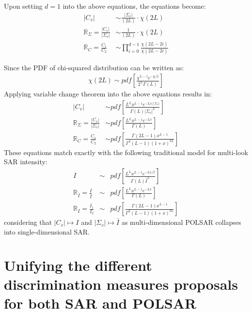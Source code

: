 \documentclass[journal]{IEEEtran}
\begin{document}
Upon setting $d=1$ into the above equations,
  the equations become:
\begin{align*}
  |C_v| &\sim  \frac{|\Sigma_v|}{(2L)} \cdot \chi (2L) \\ %
  \mathbb{R}_{\Sigma} = \frac{|C_v|}{|\Sigma_v|} &\sim \frac{1}{(2L)} \cdot \chi(2L) \\ %
\mathbb{R}_{C} = \frac{C_1}{C_2} &\sim \prod_{i=0}^{d-1} \frac{\chi(2L-2i)}{\chi(2L-2i)}
\end{align*}

Since the PDF of chi-squared distribution can be written as:
\begin{align*}
\chi(2L) \sim pdf \left[ \frac{\chi^{L-1}e^{-\chi/2}}{2^L\Gamma(L)} \right]
\end{align*}
Applying variable change theorem into the above equations results in:
\begin{align*}
  |C_v| &\sim  pdf \left[ \frac{L^L x^{L-1} e^{-Lx/|\Sigma_v|}}{\Gamma(L) |\Sigma_v|^L} \right] \\ %
  \mathbb{R}_{\Sigma} = \frac{|C_v|}{|\Sigma_v|} &\sim pdf \left[ \frac{ L^{L} x^{L-1} e^{-Lx}}{ \Gamma(L)} \right] \\ %
  \mathbb{R}_{C} = \frac{C_1}{C_2} &\sim pdf \left[ \frac{\Gamma(2L-1) x^{L-1}}{\Gamma^2(L-1) (1+x)^{2L}} \right]
\end{align*}
These equations match exactly with the following traditional model for multi-look SAR intensity:
  \begin{eqnarray}
I &\sim& pdf \left[ \frac{L^L x^{L-1} e^{-Lx/\bar{I}}}{\Gamma(L) \bar{I}^L} \right] \\
\mathbb{R}_{\bar{I}} = \frac{I}{\bar{I}} &\sim& pdf \left[ \frac{ L^{L} x^{L-1} e^{-Lx}}{ \Gamma(L)} \label{eqn:multi_look_SAR_ratio_dist} \right] \\
  \mathbb{R}_{I} = \frac{I_1}{I_2} &\sim& pdf \left[ \frac{\Gamma(2L-1) x^{L-1}}{\Gamma^2(L-1) (1+x)^{2L}} \right]
  \end{eqnarray}
considering that $|C_v| \mapsto I$ and $|\Sigma_v| \mapsto \bar{I}$ as multi-dimensional POLSAR collapses into single-dimensional SAR.

\section{Unifying the different discrimination measures proposals for both SAR and POLSAR}
\label{sec:link_sar_polsar}
\end{document}
